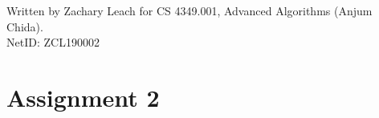 \documentclass[twoside,12pt,a4paper,english]{memoir}
\begin{document}
Written by Zachary Leach for CS 4349.001, Advanced Algorithms (Anjum Chida). \\
NetID: ZCL190002
\chapter{Assignment 2}
 



 

\end{document}
